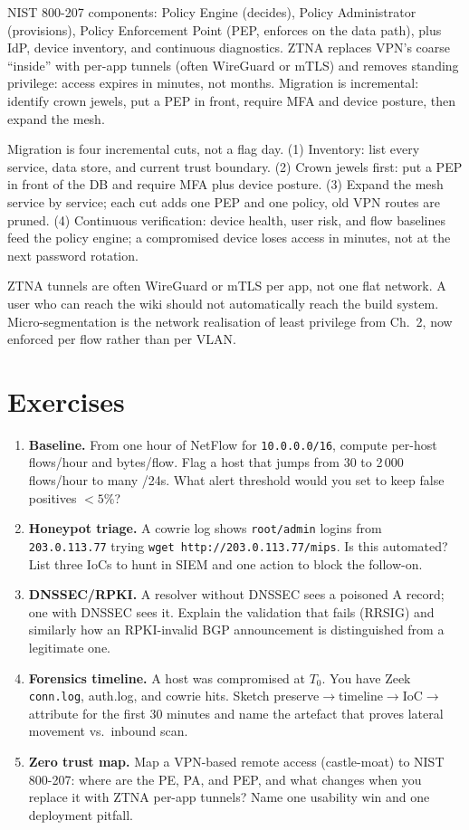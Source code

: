 NIST 800-207 components: Policy Engine (decides), Policy Administrator (provisions), Policy Enforcement Point (PEP, enforces on the data path), plus IdP, device inventory, and continuous diagnostics. ZTNA replaces VPN's coarse ``inside'' with per-app tunnels (often WireGuard or mTLS) and removes standing privilege: access expires in minutes, not months. Migration is incremental: identify crown jewels, put a PEP in front, require MFA and device posture, then expand the mesh.


Migration is four incremental cuts, not a flag day. (1) Inventory: list every service, data store, and current trust boundary. (2) Crown jewels first: put a PEP in front of the DB and require MFA plus device posture. (3) Expand the mesh service by service; each cut adds one PEP and one policy, old VPN routes are pruned. (4) Continuous verification: device health, user risk, and flow baselines feed the policy engine; a compromised device loses access in minutes, not at the next password rotation.

ZTNA tunnels are often WireGuard or mTLS per app, not one flat network. A user who can reach the wiki should not automatically reach the build system. Micro-segmentation is the network realisation of least privilege from Ch.~2, now enforced per flow rather than per VLAN.

\section{Exercises}\label{sec:ch07-exercises}
\begin{enumerate}[label=E7.\arabic*, leftmargin=*, itemsep=0.6em]
    \item \textbf{Baseline.} From one hour of NetFlow for \texttt{10.0.0.0/16}, compute per-host flows/hour and bytes/flow. Flag a host that jumps from 30 to 2\,000 flows/hour to many /24s. What alert threshold would you set to keep false positives $<5\%$?
    \item \textbf{Honeypot triage.} A cowrie log shows \texttt{root/admin} logins from \texttt{203.0.113.77} trying \texttt{wget http://203.0.113.77/mips}. Is this automated? List three IoCs to hunt in SIEM and one action to block the follow-on.
    \item \textbf{DNSSEC/RPKI.} A resolver without DNSSEC sees a poisoned A record; one with DNSSEC sees it. Explain the validation that fails (RRSIG) and similarly how an RPKI-invalid BGP announcement is distinguished from a legitimate one.
    \item \textbf{Forensics timeline.} A host was compromised at $T_0$. You have Zeek \texttt{conn.log}, auth.log, and cowrie hits. Sketch preserve$\to$timeline$\to$IoC$\to$attribute for the first 30 minutes and name the artefact that proves lateral movement vs.\ inbound scan.
    \item \textbf{Zero trust map.} Map a VPN-based remote access (castle-moat) to NIST 800-207: where are the PE, PA, and PEP, and what changes when you replace it with ZTNA per-app tunnels? Name one usability win and one deployment pitfall.
\end{enumerate}

